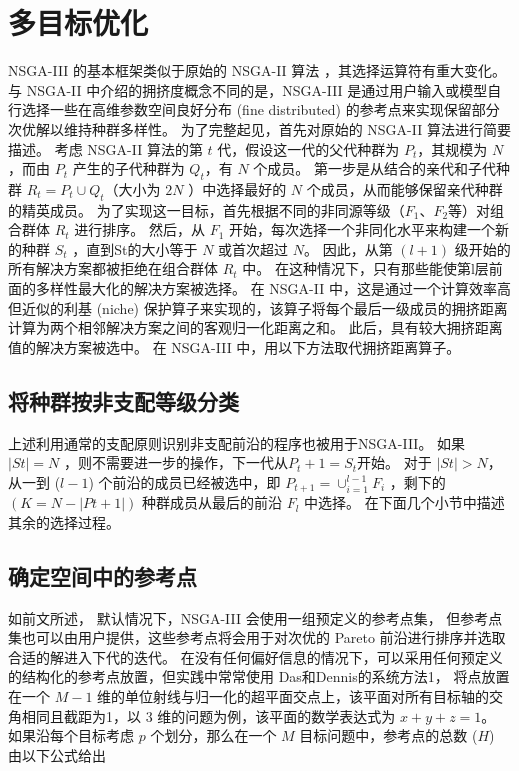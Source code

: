 \section{多目标优化}
NSGA-III 的基本框架类似于原始的 NSGA-II 算法 \cite{NSGA2}，其选择运算符有重大变化。
与 NSGA-II 中介绍的拥挤度概念不同的是，NSGA-III 是通过用户输入或模型自行选择一些在高维参数空间良好分布 (fine distributed) 的参考点来实现保留部分次优解以维持种群多样性。
为了完整起见，首先对原始的 NSGA-II 算法进行简要描述。
考虑 NSGA-II 算法的第 $t$ 代，假设这一代的父代种群为 $P_t$，其规模为 $N$ ，而由 $P_t$ 产生的子代种群为 $Q_t$，有 $N$ 个成员。
第一步是从结合的亲代和子代种群 $R_t = P_t \cup Q_t$（大小为 $2N$ ）中选择最好的 $N$ 个成员，从而能够保留亲代种群的精英成员。
为了实现这一目标，首先根据不同的非同源等级（$F_1$、$F_2$等）对组合群体 $R_t$ 进行排序。
然后，从 $F_1$ 开始，每次选择一个非同化水平来构建一个新的种群 $S_t$ ，直到St的大小等于 $N$ 或首次超过 $N$。
因此，从第 $(l+1)$ 级开始的所有解决方案都被拒绝在组合群体 $R_t$ 中。
在这种情况下，只有那些能使第l层前面的多样性最大化的解决方案被选择。
在 NSGA-II 中，这是通过一个计算效率高但近似的利基 (niche) 保护算子来实现的，该算子将每个最后一级成员的拥挤距离计算为两个相邻解决方案之间的客观归一化距离之和。
此后，具有较大拥挤距离值的解决方案被选中。
在 NSGA-III 中，用以下方法取代拥挤距离算子。

\subsection{将种群按非支配等级分类}

上述利用通常的支配原则\cite{chankong1983}识别非支配前沿的程序也被用于NSGA-III。
如果 $|St|=N$ ，则不需要进一步的操作，下一代从$P_t+1=S_t$开始。
对于 $|St|>N$，从一到 ($l-1$) 个前沿的成员已经被选中，即 $P_{t+1}= \cup_{i=1}^{l-1} F_i$ ，剩下的 $(K=N-|Pt+1|)$ 种群成员从最后的前沿 $F_l$ 中选择。
在下面几个小节中描述其余的选择过程。

\subsection{确定空间中的参考点}
如前文所述， 默认情况下，NSGA-III 会使用一组预定义的参考点集，%
但参考点集也可以由用户提供，这些参考点将会用于对次优的 Pareto 前沿进行排序并选取合适的解进入下代的迭代。
在没有任何偏好信息的情况下，可以采用任何预定义的结构化的参考点放置，但实践中常常使用 Das和Dennis的\cite{das&dennis1998}系统方法1，
将点放置在一个 $M-1$ 维的单位射线与归一化的超平面交点上，该平面对所有目标轴的交角相同且截距为1，以 3 维的问题为例，该平面的数学表达式为 $x + y + z = 1$。
如果沿每个目标考虑 $p$ 个划分，那么在一个 $M$ 目标问题中，参考点的总数 ($H$) 由以下公式给出

